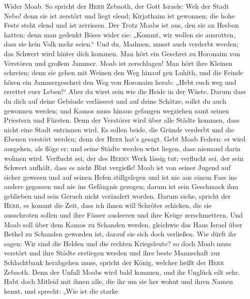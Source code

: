  Wider Moab. So spricht der \textsc{Herr} Zebaoth, der
Gott Israels: Weh der Stadt Nebo! denn sie ist zerstört und liegt elend;
Kirjathaim ist gewonnen; die hohe Feste steht elend und ist zerrissen.
 Der Trotz Moabs ist aus, den sie an Hesbon hatten; denn
man gedenkt Böses wider sie: „Kommt, wir wollen sie ausrotten, dass sie
kein Volk mehr seien.`` Und du, Madmen, musst auch verderbt werden; das
Schwert wird hinter dich kommen.  Man hört ein Geschrei zu
Horonaim von Verstören und großem Jammer.  Moab ist
zerschlagen! Man hört ihre Kleinen schreien;  denn sie
gehen mit Weinen den Weg hinauf gen Luhith, und die Feinde hören ein
Jammergeschrei den Weg von Horonaim herab:  „Hebt euch weg
und errettet euer Leben!{}`` Aber du wirst sein wie die Heide in der
Wüste.  Darum dass du dich auf deine Gebäude verlässest
und auf deine Schätze, sollst du auch gewonnen werden; und Kamos muss
hinaus gefangen wegziehen samt seinen Priestern und Fürsten.
 Denn der Verstörer wird über alle Städte kommen, dass
nicht eine Stadt entrinnen wird. Es sollen beide, die Gründe verderbt
und die Ebenen verstört werden; denn der \textsc{Herr} hat's gesagt.
 Gebt Moab Federn: er wird ausgehen, als flöge er; und
seine Städte werden wüst liegen, dass niemand darin wohnen wird.
 Verflucht sei, der des \textsc{Herrn} Werk lässig tut;
verflucht sei, der sein Schwert aufhält, dass es nicht Blut vergieße!
 Moab ist von seiner Jugend auf sicher gewesen und auf
seinen Hefen stillgelegen und ist nie aus einem Fass ins andere gegossen
und nie ins Gefängnis gezogen; darum ist sein Geschmack ihm geblieben
und sein Geruch nicht verändert worden.  Darum siehe,
spricht der \textsc{Herr}, es kommt die Zeit, dass ich ihnen will
Schröter schicken, die sie ausschroten sollen und ihre Fässer ausleeren
und ihre Krüge zerschmettern.  Und Moab soll über dem
Kamos zu Schanden werden, gleichwie das Haus Israel über Bethel zu
Schanden geworden ist, darauf sie sich doch verließen. 
Wie dürft ihr sagen: Wir sind die Helden und die rechten Kriegsleute?
 so doch Moab muss verstört und ihre Städte erstiegen
werden und ihre beste Mannschaft zur Schlachtbank herabgehen muss,
spricht der König, welcher heißt der \textsc{Herr} Zebaoth.
 Denn der Unfall Moabs wird bald kommen, und ihr Unglück
eilt sehr.  Habt doch Mitleid mit ihnen alle, die ihr um
sie her wohnt und ihren Namen kennt, und sprecht: „Wie ist die starke
